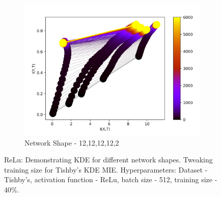 \documentclass[dissertation.tex]{subfiles}
\begin{document}
\begin{figure}[ht]
\begin{subfigure}[t]{0.32\textwidth}
    \centering
    \includegraphics[width=\textwidth]{figs/eval/networkShapeRelu/KDE3.png}
    \caption{
      Network Shape - 12,12,12,12,2
    }
  \end{subfigure}
  \hfill
  \caption{
      ReLu: Demonstrating KDE for different network shapes.  Tweaking training
      size for Tishby's KDE MIE. Hyperparameters: Dataset - Tishby's, activation
      function - ReLu, batch size - 512, training size - 40\%.
    }
  \label{figNetworkShapesReLu}
\end{figure}
\end{document}
